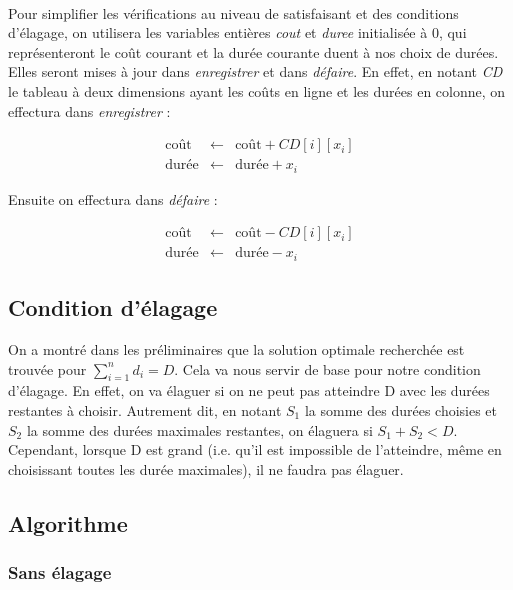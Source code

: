 \documentclass[a4paper, titlepage]{article}
\begin{document}
		\paragraph{}
		Pour simplifier les vérifications au niveau de satisfaisant et des conditions d'élagage, on utilisera les variables entières \emph{cout} et \emph{duree} initialisée à 0,
		qui représenteront le coût courant et la durée courante duent à nos choix de durées.
		Elles seront mises à jour dans \emph{enregistrer} et dans \emph{défaire}.
		En effet, en notant \emph{CD} le tableau à deux dimensions ayant les coûts en ligne et les durées en colonne, on effectura dans \emph{enregistrer} :

			\begin{eqnarray*}
				\mbox{coût}  & \leftarrow & \mbox{coût} + CD[i][x_{i}] \\
				\mbox{durée} & \leftarrow & \mbox{durée} + x_{i}
			\end{eqnarray*}

		Ensuite on effectura dans \emph{défaire} :

			\begin{eqnarray*}
				\mbox{coût}  & \leftarrow & \mbox{coût} - CD[i][x_{i}] \\
				\mbox{durée} & \leftarrow & \mbox{durée} - x_{i}
			\end{eqnarray*}


	\subsection{Condition d'élagage}
	On a montré dans les préliminaires que la solution optimale recherchée est trouvée pour $\sum_{i=1}^{n} d_i = D$.
	Cela va nous servir de base pour notre condition d'élagage.
	En effet, on va élaguer si on ne peut pas atteindre D avec les durées restantes à choisir.
	Autrement dit, en notant $S_1$ la somme des durées choisies et $S_2$ la somme des durées maximales restantes, on élaguera si $S_1 + S_2 < D$.
	Cependant, lorsque D est grand (i.e. qu'il est impossible de l'atteindre, même en choisissant toutes les durée maximales), il ne faudra pas élaguer.


	\subsection{Algorithme}

		\subsubsection{Sans élagage}
\end{document}
